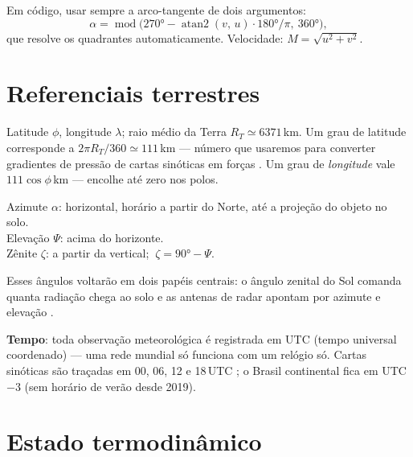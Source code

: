 \documentclass[11pt]{article}
\begin{document}
\begin{formadif}
Em código, usar sempre a arco-tangente de dois argumentos:
\[ \alpha = \operatorname{mod}\bigl(270° - \operatorname{atan2}(v,\,u)\cdot 180°/\pi,\ 360°\bigr), \]
que resolve os quadrantes automaticamente. Velocidade: $M=\sqrt{u^2+v^2}$.
\end{formadif}


\section{Referenciais terrestres}\label{sec:terra}

Latitude $\phi$, longitude $\lambda$; raio médio da Terra
$R_T \simeq 6371$\,km. Um grau de latitude corresponde a
$2\pi R_T/360 \simeq 111$\,km — número que usaremos para converter gradientes
de pressão de cartas sinóticas em forças . Um grau de \emph{longitude} vale $111\cos\phi$\,km — encolhe até
zero nos polos.


\begin{noquadro}
Azimute $\alpha$: horizontal, horário a partir do Norte, até a projeção do
objeto no solo.\\
Elevação $\Psi$: acima do horizonte.\\
Zênite $\zeta$: a partir da vertical; $\ \zeta = 90° - \Psi$.
\end{noquadro}

Esses ângulos voltarão em dois papéis centrais: o ângulo zenital do Sol
comanda quanta radiação chega ao solo  e as antenas de
radar apontam por azimute e elevação .

\textbf{Tempo}: toda observação meteorológica é registrada em UTC (tempo
universal coordenado) — uma rede mundial só funciona com um relógio só.
Cartas sinóticas são traçadas em 00, 06, 12 e 18\,UTC
; o Brasil continental fica em UTC$-3$
(sem horário de verão desde 2019).

\section{Estado termodinâmico}\label{sec:estado}
\end{document}
